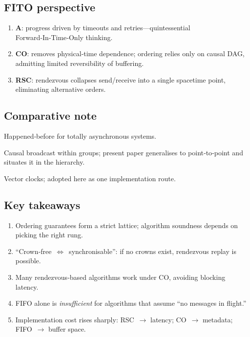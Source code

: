 \subsection{FITO perspective}
\begin{enumerate}[label=\arabic*.]
  \item \textbf{A}: progress driven by timeouts and retries—quintessential Forward‑In‑Time‑Only thinking.
  \item \textbf{CO}: removes physical‑time dependence; ordering relies only on causal DAG, admitting limited reversibility of buffering.
  \item \textbf{RSC}: rendezvous collapses send/receive into a single spacetime point, eliminating alternative orders.
\end{enumerate}

\subsection{Comparative note}
\begin{description}[leftmargin=*,style=nextline]
  \item[Lamport (1978)] Happened‑before for totally asynchronous systems.
  \item[Birman \& Joseph (1987)] Causal broadcast within groups; present paper generalises to point‑to‑point and situates it in the hierarchy.
  \item[Fidge (1991)] Vector clocks; adopted here as one implementation route.
\end{description}

\subsection{Key takeaways}
\begin{enumerate}
  \item Ordering guarantees form a strict lattice; algorithm soundness depends on picking the right rung.
  \item “Crown‑free $\iff$ synchronisable”: if no crowns exist, rendezvous replay is possible.
  \item Many rendezvous‑based algorithms work under CO, avoiding blocking latency.
  \item FIFO alone is \emph{insufficient} for algorithms that assume “no messages in flight.”
  \item Implementation cost rises sharply: RSC $\to$ latency; CO $\to$ metadata; FIFO $\to$ buffer space.
\end{enumerate}

